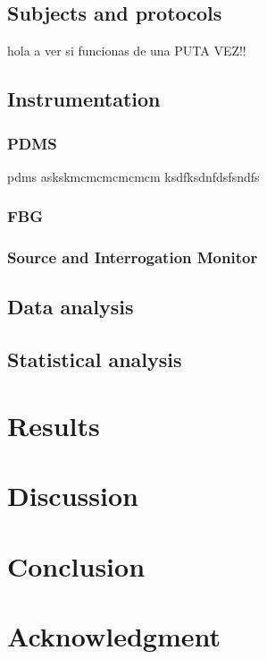\documentclass[conference]{IEEEtran}
\begin{document}
	\subsection{Subjects and protocols}
	hola a ver si funcionas de una PUTA VEZ!!
	
	\subsection{Instrumentation}
	\cite{dos}
	
	\subsubsection{PDMS}
	pdms askskmcmcmcmcmcm ksdfksdnfdsfsndfs
	
	
	\subsubsection{FBG}
	
	\subsubsection{Source and Interrogation Monitor}
	
	
	\subsection{Data analysis}
	
	
	\subsection{Statistical analysis}
	
	
	
	
	\section{Results}
	
	
	
	\section{Discussion}
	
	
	
	
	\section{Conclusion}
	
	
	
	
	\section*{Acknowledgment}
	
	

	\printbibliography
	
		
	
\end{document}
